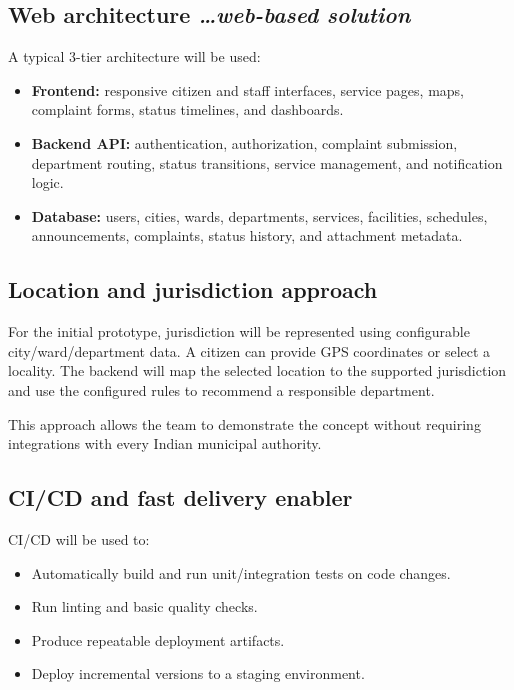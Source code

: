 \documentclass[11pt,a4paper]{article}
\newcommand{\BvrHint}[1]{{\normalfont\normalsize\itshape\hfill #1}}
\begin{document}
\subsection{Web architecture %
\BvrHint{\ldots web-based solution}}
A typical 3-tier architecture will be used:
\begin{itemize}[leftmargin=0.7cm]
    \item \textbf{Frontend:} responsive citizen and staff interfaces, service pages, maps, complaint forms, status timelines, and dashboards. 
    \item \textbf{Backend API:} authentication, authorization, complaint submission, department routing, status transitions, service management, and notification logic.
    \item \textbf{Database:} users, cities, wards, departments, services, facilities, schedules, announcements, complaints, status history, and attachment metadata.
\end{itemize}

\subsection{Location and jurisdiction approach}
For the initial prototype, jurisdiction will be represented using configurable city/ward/department data. A citizen can provide GPS coordinates or select a locality. The backend will map the selected location to the supported jurisdiction and use the configured rules to recommend a responsible department.

This approach allows the team to demonstrate the concept without requiring integrations with every Indian municipal authority.

\subsection{CI/CD and fast delivery enabler}
CI/CD will be used to:
\begin{itemize}[leftmargin=0.7cm]
    \item Automatically build and run unit/integration tests on code changes.
    \item Run linting and basic quality checks.
    \item Produce repeatable deployment artifacts.
    \item Deploy incremental versions to a staging environment.
\end{itemize}
\end{document}

